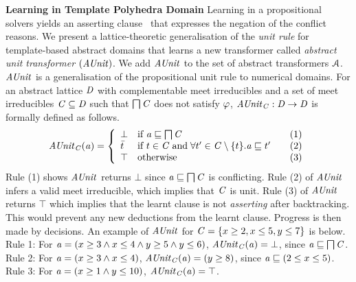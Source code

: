 \noindent \textbf{Learning in Template Polyhedra Domain}
%
Learning in a propositional solvers yields an asserting clause~\cite{cdcl}
that expresses the negation of the conflict reasons.  We present a
lattice-theoretic generalisation of the {\em unit rule} for template-based
abstract domains that learns a new transformer called {\em abstract unit
transformer} $(\mathit{AUnit})$.  We add $\mathit{AUnit}$ to the set of abstract
transformers $\mathcal{A}$.  $\mathit{AUnit}$ is a generalisation of the
propositional unit rule to numerical domains.  For an abstract lattice
$\mathit{D}$ with complementable meet irreducibles and a set of meet
irreducibles $\mathit{C} \subseteq \mathit{D}$ such that $\bigsqcap
\mathit{C}$ does not satisfy $\varphi$, $\mathit{AUnit}_{\mathit{C}}: \mathit{D}
\rightarrow \mathit{D}$ is formally defined as follows.
%
\[ \aunit_\conflictset(\absval) =
 \left\{\begin{array}{l@{\quad}l@{\qquad}l}
  \bot       & \text{if } \absval \sqsubseteq \bigsqcap \conflictset & (1)\\
  \bar{t}    & \text{if } t \in \conflictset \; \text{and} \; \forall t' \in \conflictset
  \setminus \{t\}. \absval  \sqsubseteq t' & (2) \\
  \top & \text{otherwise} & (3) \\
 \end{array}\right.
\]
%
Rule (1) shows $\mathit{AUnit}$ returns $\bot$ since $\mathit{a} \sqsubseteq \bigsqcap
\mathit{C}$ is conflicting.  Rule (2) of $\mathit{AUnit}$ infers a valid meet
irreducible, which implies that $\mathit{C}$ is unit.  Rule (3) of
$\mathit{AUnit}$ returns $\top$ which implies that the learnt clause is not {\em
asserting} after backtracking.  This would prevent any new deductions from
the learnt clause.  Progress is then made by decisions.  An example of
$\mathit{AUnit}$ for $\mathit{C} = \{x \geq 2, x \leq 5, y \leq 7 \}$ is below.  \\
%
Rule 1: 
For $\mathit{a} = (x \geq 3\wedge\allowbreak x \leq
4\wedge\allowbreak y \geq 5\wedge y \leq 6)$, 
$\mathit{AUnit}_{\mathit{C}}(\mathit{a}) = \bot$, since $\mathit{a}
\sqsubseteq \bigsqcap\mathit{C}$.  \\ 
Rule 2:  
For $\mathit{a} = (x \geq 3\wedge x \leq 4)$,  
$\mathit{AUnit}_{\mathit{C}}(\mathit{a}) = (y \geq 8)$, since
$\mathit{a} \sqsubseteq (2 \leq x \leq 5)$. \\ 
%
Rule 3: 
For $\mathit{a} = (x \geq 1\wedge y \leq 10)$, 
$\mathit{AUnit}_{\mathit{C}}(\mathit{a}) = \top$. \\



